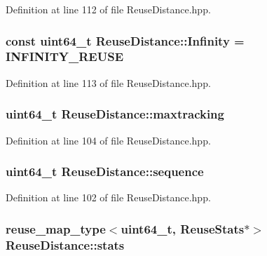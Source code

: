 Definition at line 112 of file ReuseDistance.hpp.

\hypertarget{class_reuse_distance_a59f7f0ac6ad014472537619394ac7375}{
\subsubsection[{Infinity}]{\setlength{\rightskip}{0pt plus 5cm}const uint64\_\-t {\bf ReuseDistance::Infinity} = INFINITY\_\-REUSE}}
\label{class_reuse_distance_a59f7f0ac6ad014472537619394ac7375}


Definition at line 113 of file ReuseDistance.hpp.

\hypertarget{class_reuse_distance_ac3e8daa6fa8c16cdf955fd6cf99ba932}{
\subsubsection[{maxtracking}]{\setlength{\rightskip}{0pt plus 5cm}uint64\_\-t {\bf ReuseDistance::maxtracking}}}
\label{class_reuse_distance_ac3e8daa6fa8c16cdf955fd6cf99ba932}


Definition at line 104 of file ReuseDistance.hpp.

\hypertarget{class_reuse_distance_a5d38c22d7841765630b828eed50ac345}{
\subsubsection[{sequence}]{\setlength{\rightskip}{0pt plus 5cm}uint64\_\-t {\bf ReuseDistance::sequence}}}
\label{class_reuse_distance_a5d38c22d7841765630b828eed50ac345}


Definition at line 102 of file ReuseDistance.hpp.

\hypertarget{class_reuse_distance_a37e4f6796798fe8839e94c956b4354ee}{
\subsubsection[{stats}]{\setlength{\rightskip}{0pt plus 5cm}reuse\_\-map\_\-type$<$uint64\_\-t, {\bf ReuseStats}$\ast$$>$ {\bf ReuseDistance::stats}}}
\label{class_reuse_distance_a37e4f6796798fe8839e94c956b4354ee}


